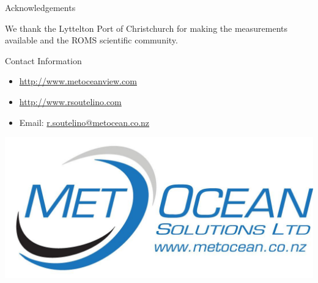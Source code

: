 \documentclass[final]{beamer}
\newlength{\onecolwid}
\begin{document}
\begin{frame}[t]
\begin{columns}[t]
\begin{column}{\onecolwid}



    \begin{block}{Acknowledgements}

    \small{We thank the Lyttelton Port of Christchurch for making the measurements available and the ROMS scientific community. } \\

    \end{block}



    \begin{block}{Contact Information}

    \begin{small}
    \begin{itemize}
    \item \href{http://www.metoceanview.com}{http://www.metoceanview.com}
    \item \href{http://www.rsoutelino.com}{http://www.rsoutelino.com}
    \item Email: \href{mailto:r.soutelino@metocean.co.nz}{r.soutelino@metocean.co.nz}
    \end{itemize}
    \end{small}

    \end{block}

    \vspace{3.2cm}

    \begin{flushright}
    \includegraphics[width=0.7\linewidth]{msllogo.jpg}
    \end{flushright}


\end{column}
\end{columns}
\end{frame}
\end{document}
